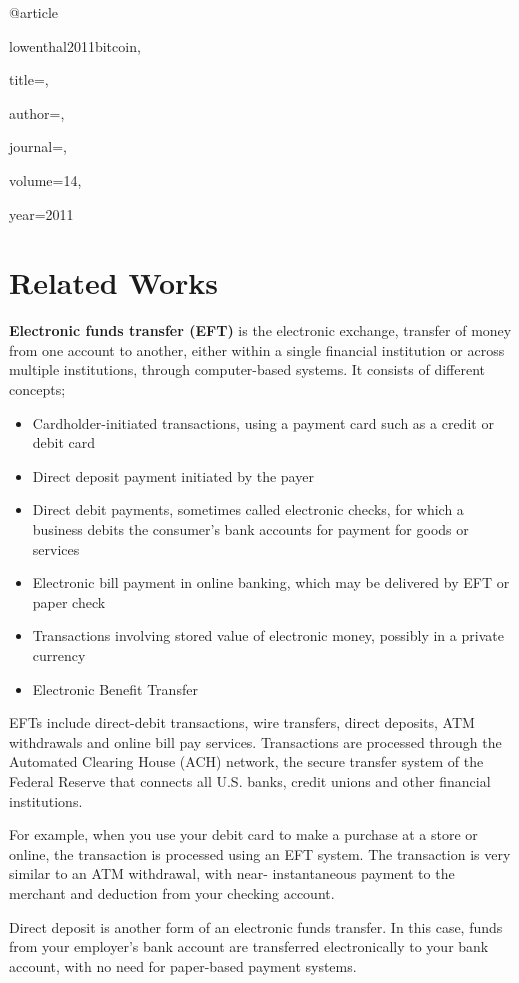 @article{lowenthal2011bitcoin,

 title={},

 author={},

 journal={},

 volume={14},

 year={2011}

}


\chapter{Related Works}
\textbf{Electronic funds transfer (EFT)} is the electronic exchange, transfer of money from one account to
another, either within a single financial institution or across multiple institutions, through computer-based 
systems.
It consists of different concepts;
\begin{itemize}
	\item Cardholder-initiated transactions, using a payment card such as a credit or debit card
	\item Direct deposit payment initiated by the payer
	\item Direct debit payments, sometimes called electronic checks, for which a business debits the consumer's bank accounts for payment for goods or services
	\item Electronic bill payment in online banking, which may be delivered by EFT or paper check
	\item Transactions involving stored value of electronic money, possibly in a private currency
	\item Electronic Benefit Transfer
\end{itemize}
EFTs include direct-debit transactions, wire transfers, direct deposits, ATM withdrawals and online 
bill pay services. Transactions are processed through the Automated Clearing House (ACH) network, 
the secure transfer system of the Federal Reserve that connects all U.S. banks, credit unions and other 
financial institutions.

For example, when you use your debit card to make a purchase at a store or online, the transaction 
is processed using an EFT system. The transaction is very similar to an ATM withdrawal, with near-
instantaneous payment to the merchant and deduction from your checking account.

Direct deposit is another form of an electronic funds transfer. In this case, funds from your employer’s
bank account are transferred electronically to your bank account, with no need for paper-based payment 
systems.

